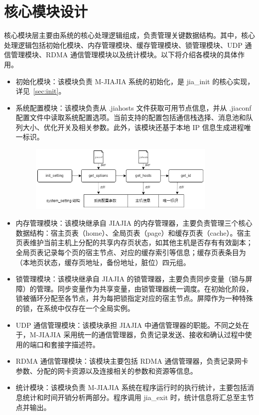 {\section{核心模块设计}
核心模块层主要由系统的核心处理逻辑组成，负责管理关键数据结构。其中，核心处理逻辑包括初始化模块、内存管理模块、缓存管理模块、锁管理模块、UDP 通信管理模块、RDMA 通信管理模块以及统计模块。以下将介绍各模块的具体作用。
\begin{itemize}
    \item 初始化模块：该模块负责 M-JIAJIA 系统的初始化，是 jia\_init 的核心实现，详见~\ref{sec:init}。
    \item 系统配置模块：该模块负责从 .jiahosts 文件获取可用节点信息，并从 .jiaconf 配置文件中读取系统配置选项。当前支持的配置包括通信栈选择、消息池和队列大小、优化开关及相关参数。此外，该模块还基于本地 IP 信息生成进程唯一标识。
    \begin{figure}[!htbp]
        \centering
        \includegraphics[width=0.85\textwidth]{Img/system_setting.png}
        \label{fig:system-setting-module}
    \end{figure}
    
    \item 内存管理模块：该模块继承自 JIAJIA 的内存管理器，主要负责管理三个核心数据结构：宿主页表（home）、全局页表（page）和缓存页表（cache）。宿主页表维护当前主机上分配的共享内存页状态，如其他主机是否存有有效副本；全局页表记录每个页的宿主节点、对应的缓存索引等信息；缓存页表条目为（本地页状态，缓存页地址，备份地址，脏位）四元组。
    \item 锁管理模块：该模块继承自 JIAJIA 的锁管理器，主要负责同步变量（锁与屏障）的管理。同步变量作为共享变量，由锁管理器统一调度。在初始化阶段，锁被循环分配至各节点，并为每把锁指定对应的宿主节点。屏障作为一种特殊的锁，在系统中仅存在一个全局实例。
    \item UDP 通信管理模块：该模块承担 JIAJIA 中通信管理器的职能。不同之处在于，M-JIAJIA 采用统一的通信管理器，负责记录发送、接收和确认过程中使用的端口和套接字描述符。
    \item RDMA 通信管理模块：该模块主要包括 RDMA 通信管理器，负责记录网卡参数、分配的网卡资源以及连接相关的参数和资源等信息。
    \item 统计模块：该模块负责 M-JIAJIA 系统在程序运行时的执行统计，主要包括消息统计和时间开销分析两部分。程序调用 jia\_exit 时，统计信息将汇总至主节点并输出。
\end{itemize}
}
